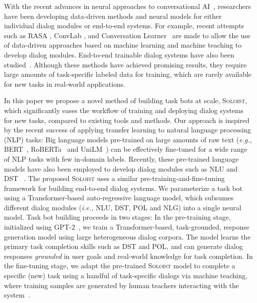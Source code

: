\documentclass[11pt,a4paper]{article}
\newcommand{\ie}[0]{\emph{i.e., }}
\newcommand{\eg}[0]{\emph{e.g., }}
\newcommand{\model}{\textsc{Soloist}}
\begin{document}
With the recent advances in neural approaches to conversational AI~\cite{gao2019neural}, researchers have been developing data-driven methods and neural models for either individual dialog modules or end-to-end systems.
For example, recent attempts such as RASA \cite{rasa}, ConvLab \cite{convlab, convlab-2}, and Conversation Learner~\cite{shukla2020conversation} are made to allow the use of data-driven approaches based on machine learning and machine teaching to develop dialog modules. 
End-to-end trainable dialog systems have also been studied~\cite[\eg][]{wen2016network,zhao2016towards,li2017end,williams2017hybrid,lei2018sequicity, gao2019neural, zhang2019task}. Although these methods have achieved promising results, they require large amounts of task-specific labeled data for training, which are rarely available for new tasks in real-world applications.

In this paper we propose a novel method of building task bots at scale, \model{}, which significantly eases the workflow of training and deploying dialog systems for new tasks, compared to existing tools and methods.
Our approach is inspired by the recent success of applying transfer learning to natural language processing (NLP) tasks:
Big language models pre-trained on large amounts of raw text (\eg BERT~\cite{devlin2019bert}, RoBERTa~\cite{liu2019roberta} and UniLM~\cite{dong2019unified}) can be effectively fine-tuned for a wide range of NLP tasks with few in-domain labels. 
Recently, these pre-trained language models have also been employed to develop dialog modules such as NLU and DST ~\cite{DBLP:conf/emnlp/HendersonCMSWV20,DBLP:conf/acl/CoopeFGVH20,Wu2020ToDBERTPN}. 
The proposed \model{} uses a similar pre-training-and-fine-tuning framework for building end-to-end dialog systems.
We parameterize a task bot using a Transformer-based auto-regressive language model, which subsumes different dialog modules (\ie NLU, DST, POL and NLG) into a single neural model.
Task bot building proceeds in two stages: 
 In the pre-training stage, initialized using GPT-2~\cite{gpt2}, we train a Transformer-based, task-grounded, response generation model using large heterogeneous dialog corpora. The model learns the primary task completion skills such as DST and POL, and can generate dialog responses \emph{grounded} in user goals and real-world knowledge for task completion. 
 In the fine-tuning stage, we adapt the pre-trained \model{} model to complete a specific (new) task using a handful of task-specific dialogs via machine teaching, where training samples are generated by human teachers interacting with the system~\cite{zhu2015machine,shukla2020conversation}.
\end{document}
